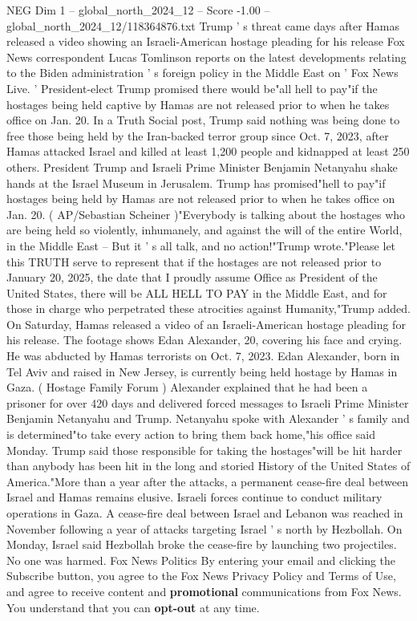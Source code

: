\begin{textsample}{NEG Dim 1 – global\_north\_2024\_12 – Score -1.00 – global\_north\_2024\_12/118364876.txt}  \label{ex:f1_neg_220}
Trump ' s threat came days after Hamas released a video showing an Israeli-American hostage pleading for his release Fox News correspondent Lucas Tomlinson reports on the latest developments relating to the Biden administration ' s foreign policy in the Middle East on ' Fox News Live. ' President-elect Trump promised there would be"all hell to pay"if the hostages being held captive by Hamas are not released prior to when he takes office on Jan. 20.
In a Truth Social post, Trump said nothing was being done to free those being held by the Iran-backed terror group since Oct. 7, 2023, after Hamas attacked Israel and killed at least 1,200 people and kidnapped at least 250 others.
President Trump and Israeli Prime Minister Benjamin Netanyahu shake hands at the Israel Museum in Jerusalem.
Trump has promised"hell to pay"if hostages being held by Hamas are not released prior to when he takes office on Jan. 20. ( AP/Sebastian Scheiner )"Everybody is talking about the hostages who are being held so violently, inhumanely, and against the will of the entire World, in the Middle East -- But it ' s all talk, and no action!"Trump wrote."Please let this TRUTH serve to represent that if the hostages are not released prior to January 20, 2025, the date that I proudly assume Office as President of the United States, there will be ALL HELL TO PAY in the Middle East, and for those in charge who perpetrated these atrocities against Humanity,"Trump added.
On Saturday, Hamas released a video of an Israeli-American hostage pleading for his release.
The footage shows Edan Alexander, 20, covering his face and crying.
He was abducted by Hamas terrorists on Oct. 7, 2023.
Edan Alexander, born in Tel Aviv and raised in New Jersey, is currently being held hostage by Hamas in Gaza. ( Hostage Family Forum ) Alexander explained that he had been a prisoner for over 420 days and delivered forced messages to Israeli Prime Minister Benjamin Netanyahu and Trump.
Netanyahu spoke with Alexander ' s family and is determined"to take every action to bring them back home,"his office said Monday.
Trump said those responsible for taking the hostages"will be hit harder than anybody has been hit in the long and storied History of the United States of America."More than a year after the attacks, a permanent cease-fire deal between Israel and Hamas remains elusive.
Israeli forces continue to conduct military operations in Gaza.
A cease-fire deal between Israel and Lebanon was reached in November following a year of attacks targeting Israel ' s north by Hezbollah.
On Monday, Israel said Hezbollah broke the cease-fire by launching two projectiles.
No one was harmed.
Fox News Politics By entering your email and clicking the Subscribe button, you agree to the Fox News Privacy Policy and Terms of Use, and agree to receive content and \textbf{promotional} communications from Fox News.
You understand that you can \textbf{opt-out} at any time.

\end{textsample}
